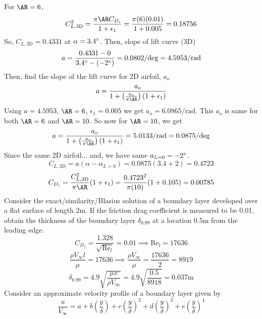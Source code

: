 \documentclass[12pt, twocolumn, letterpaper]{article}
\begin{document}
For $\AR=6$, 
\begin{equation*}
    C_{L,\text{3D}}^2=\frac{\pi\AR C_{D_i}}{1+\epsilon_1}=\frac{\pi(6)(0.01)}{1+0.005}=0.18756
\end{equation*}
So, $C_{L,\text{3D}}=0.4331$ at $\alpha=3.4\degree$. Then, slope of lift curve (3D)
\begin{equation*}
    a=\frac{0.4331-0}{3.4\degree-(-2\degree)}=0.0802/\text{deg}=4.5953/\text{rad}
\end{equation*}
Then, find the slope of the lift curve for 2D airfoil, $a_o$
\begin{equation*}
    a=\frac{a_o}{1+\left(\frac{a_o}{\pi\AR}\right)(1+\epsilon_1)}
\end{equation*}
Using $a=4.5953$, $\AR=6$, $\epsilon_1=0.005$ we get $a_o=6.0865/\text{rad}$. This $a_o$ is same for both $\AR=6$ and $\AR=10$. So now for $\AR=10$, we get
\begin{equation*}
    a=\frac{a_o}{1+\left(\frac{a_o}{\pi\AR}\right)(1+\epsilon_1)}=5.0133/\text{rad}=0.0875/\text{deg}
\end{equation*}
Since the same 2D airfoil... and, we have same $a_{L=0}=-2\degree$.
\begin{equation*}
    C_{L,\text{3D}}=a\left(\alpha-\alpha_{L=0}\right)=0.0875(3.4+2)=0.4723
\end{equation*}
\begin{equation*}
    C_{D_i}=\frac{C_{L,\text{3D}}^2}{\pi\AR}(1+\epsilon_1)=\frac{0.4723^2}{\pi (10)}(1+0.105)=0.00785
\end{equation*}
\hline
Consider the exact/similarity/Blasius solution of a boundary layer developed over a flat surface of length 2m. If the friction drag coefficient is measured to be 0.01, obtain the thickness of the boundary layer $\delta_{0.99}$ at a location 0.5m from the leading edge.
\begin{equation*}
    C_{D_f}=\frac{1.328}{\sqrt{\text{Re}_l}}=0.01\implies \text{Re}_l=17636
\end{equation*}
\begin{equation*}
    \frac{\rho V_\infty l}{\mu}=17636\implies\frac{\rho V_\infty}{\mu}=\frac{17636}{2}=8919
\end{equation*}
\begin{equation*}
    \delta_{0.99}=4.9\sqrt{\frac{\mu x}{\rho V_\infty}}=4.9\sqrt{\frac{0.5}{8918}}=0.037\text{m}
\end{equation*}
\hline
Consider an approximate velocity profile of a boundary layer given by
\begin{equation*}
    \frac{u}{V_\infty}=a+b\left(\frac{y}{\delta}\right)+c\left(\frac{y}{\delta}\right)^2+d\left(\frac{y}{\delta}\right)^3+e\left(\frac{y}{\delta}\right)^4
\end{equation*}
\end{document}
